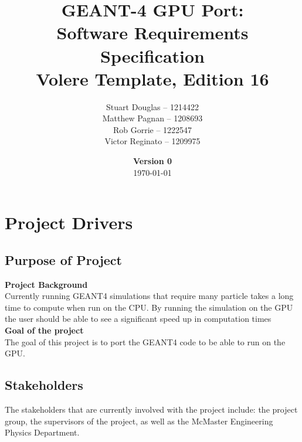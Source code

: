 \documentclass[12pt]{article}
\title{
	\LARGE GEANT-4 GPU Port:
	\\\vspace{10mm}
	\large \textbf{Software Requirements Specification}
	\\Volere Template, Edition 16
	\vspace{40mm}
}
\author{
	Stuart Douglas -- 1214422
	\\Matthew Pagnan -- 1208693
	\\Rob Gorrie -- 1222547
	\\Victor Reginato -- 1209975
	\vspace{10mm}
}
\date{\vfill \textbf{Version 0}\\ \today}
\begin{document}

\maketitle
\newpage

\tableofcontents
{}

\section{Project Drivers}

\subsection{Purpose of Project} %
\textbf{Project Background}\\
Currently running GEANT4 simulations that require many particle takes a long time to compute when run on the CPU. By running the simulation on the GPU the user should be able to see a significant speed up in computation times\\
\newline
\textbf{Goal of the project}\\
The goal of this project is to port the GEANT4 code to be able to run on the GPU.

\subsection{Stakeholders} %
The stakeholders that are currently involved with the project include: the project group, the supervisors of the project, as well as the McMaster Engineering Physics Department.
\end{document}
